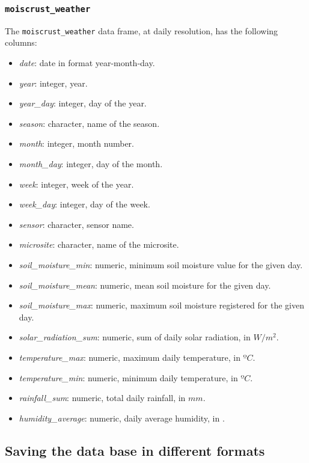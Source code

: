 \documentclass[
  table]{article}
\providecommand{\tightlist}{%
  \setlength{\itemsep}{0pt}\setlength{\parskip}{0pt}}
\begin{document}
\hypertarget{moiscrust_weather}{%
\subsubsection{\texorpdfstring{\texttt{moiscrust\_weather}}{moiscrust\_weather}}\label{moiscrust_weather}}

The \texttt{moiscrust\_weather} data frame, at daily resolution, has the
following columns:

\begin{itemize}
\tightlist
\item
  \emph{date}: date in format year-month-day.
\item
  \emph{year}: integer, year.
\item
  \emph{year\_day}: integer, day of the year.
\item
  \emph{season}: character, name of the season.
\item
  \emph{month}: integer, month number.
\item
  \emph{month\_day}: integer, day of the month.
\item
  \emph{week}: integer, week of the year.
\item
  \emph{week\_day}: integer, day of the week.
\item
  \emph{sensor}: character, sensor name.
\item
  \emph{microsite}: character, name of the microsite.
\item
  \emph{soil\_moisture\_min}: numeric, minimum soil moisture value for
  the given day.
\item
  \emph{soil\_moisture\_mean}: numeric, mean soil moisture for the given
  day.
\item
  \emph{soil\_moisture\_max}: numeric, maximum soil moisture registered
  for the given day.
\item
  \emph{solar\_radiation\_sum}: numeric, sum of daily solar radiation,
  in \(W/m^2\).
\item
  \emph{temperature\_max}: numeric, maximum daily temperature, in
  \(ºC\).
\item
  \emph{temperature\_min}: numeric, minimum daily temperature, in
  \(ºC\).
\item
  \emph{rainfall\_sum}: numeric, total daily rainfall, in \(mm\).
\item
  \emph{humidity\_average}: numeric, daily average humidity, in \(%
  \).
\end{itemize}

\hypertarget{saving-the-data-base-in-different-formats}{%
\subsection{Saving the data base in different
formats}\label{saving-the-data-base-in-different-formats}}
\end{document}
